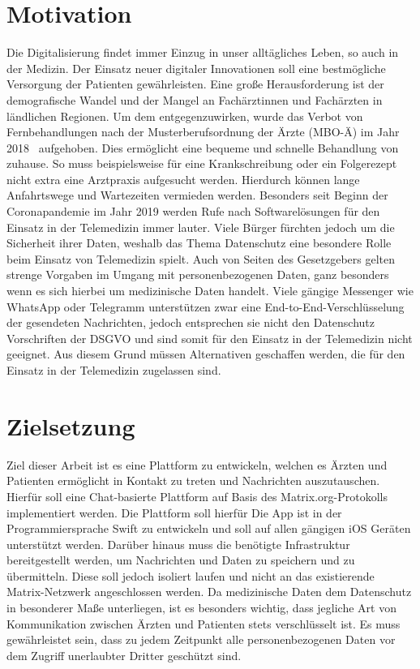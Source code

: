    \section{Motivation}\label{sec:motivation}
    Die Digitalisierung findet immer Einzug in unser alltägliches Leben, so auch in der Medizin.
    Der Einsatz neuer digitaler Innovationen soll eine bestmögliche Versorgung der Patienten gewährleisten.
    Eine große Herausforderung ist der demografische Wandel und der Mangel an Fachärztinnen und Fachärzten in ländlichen Regionen.
    Um dem entgegenzuwirken, wurde das Verbot von Fernbehandlungen nach der Musterberufsordnung der Ärzte (MBO-Ä) im Jahr 2018~\cite{beschlussprotokol} aufgehoben.
    Dies ermöglicht eine bequeme und schnelle Behandlung von zuhause.
    So muss beispielsweise für eine Krankschreibung oder ein Folgerezept nicht extra eine Arztpraxis aufgesucht werden.
    Hierdurch können lange Anfahrtswege und Wartezeiten vermieden werden.
    Besonders seit Beginn der Coronapandemie im Jahr 2019 werden Rufe nach Softwarelösungen für den Einsatz in der Telemedizin immer lauter.
    Viele Bürger fürchten jedoch um die Sicherheit ihrer Daten, weshalb das Thema Datenschutz eine besondere Rolle beim Einsatz von Telemedizin spielt.
    Auch von Seiten des Gesetzgebers gelten strenge Vorgaben im Umgang mit personenbezogenen Daten, ganz besonders wenn es sich hierbei um medizinische Daten handelt.
    Viele gängige Messenger wie WhatsApp oder Telegramm unterstützen zwar eine End-to-End-Verschlüsselung der gesendeten Nachrichten, jedoch entsprechen sie nicht den Datenschutz Vorschriften der DSGVO und sind somit für den Einsatz in der Telemedizin nicht geeignet.
    Aus diesem Grund müssen Alternativen geschaffen werden, die für den Einsatz in der Telemedizin zugelassen sind.

    \newpage
    \section{Zielsetzung}\label{sec:zielsetzung}
    Ziel dieser Arbeit ist es eine Plattform zu entwickeln, welchen es Ärzten und Patienten ermöglicht in Kontakt zu treten und Nachrichten auszutauschen.
    Hierfür soll eine Chat-basierte Plattform auf Basis des Matrix.org-Protokolls implementiert werden.
    Die Plattform soll hierfür
    Die App ist in der Programmiersprache Swift zu entwickeln und soll auf allen gängigen iOS Geräten unterstützt werden.
    Darüber hinaus muss die benötigte Infrastruktur bereitgestellt werden, um Nachrichten und Daten zu speichern und zu übermitteln.
    Diese soll jedoch isoliert laufen und nicht an das existierende Matrix-Netzwerk angeschlossen werden.
    Da medizinische Daten dem Datenschutz in besonderer Maße unterliegen, ist es besonders wichtig,
    dass jegliche Art von Kommunikation zwischen Ärzten und Patienten stets verschlüsselt ist.
    Es muss gewährleistet sein, dass zu jedem Zeitpunkt alle personenbezogenen Daten vor dem Zugriff unerlaubter Dritter geschützt sind.

